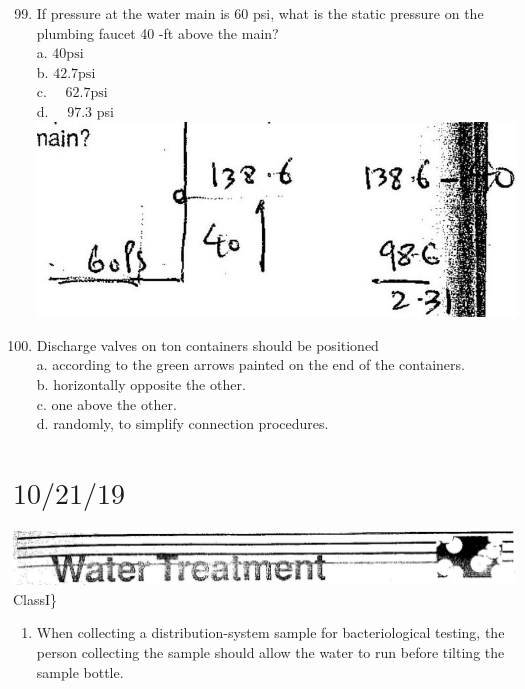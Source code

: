 \documentclass[10pt]{article}
\begin{document}
\begin{enumerate}
  \setcounter{enumi}{98}
  \item If pressure at the water main is 60 psi, what is the static pressure on the plumbing faucet 40 -ft above the main?\\
a. $40 \mathrm{psi}$\\
b. $42.7 \mathrm{psi}$\\
c. $\quad 62.7 \mathrm{psi}$\\
d. $\quad 97.3$ psi\\

\includegraphics[max width=\textwidth]{2022_11_11_ca6a6c1a0324ee23e523g-16(2)}

  \item Discharge valves on ton containers should be positioned\\
a. according to the green arrows painted on the end of the containers.\\
b. horizontally opposite the other.\\
c. one above the other.\\
d. randomly, to simplify connection procedures.

\end{enumerate}

\section{$10 / 21 / 19$}
\includegraphics[max width=\textwidth]{2022_11_11_ca6a6c1a0324ee23e523g-17} ClassI\}

\begin{enumerate}
  \item When collecting a distribution-system sample for bacteriological testing, the person collecting the sample should allow the water to run before tilting the sample bottle.
\end{enumerate}
\end{document}
